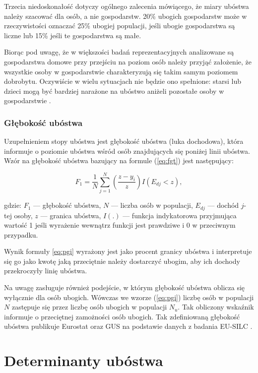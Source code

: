 Trzecia niedoskonałość dotyczy ogólnego zalecenia mówiącego, że miary ubóstwa należy szacować dla osób, a nie gospodarstw. 20\% ubogich gospodarstw może w rzeczywistości oznaczać 25\% ubogiej populacji, jeśli ubogie gospodarstwa są liczne lub 15\% jeśli te gospodarstwa są małe.

Biorąc pod uwagę, że w większości badań reprezentacyjnych analizowane są gospodarstwa domowe przy przejściu na poziom osób należy przyjąć założenie, że wszystkie osoby w gospodarstwie charakteryzują się takim samym poziomem dobrobytu. Oczywiście w wielu sytuacjach nie będzie ono spełnione: starsi lub dzieci mogą być bardziej narażone na ubóstwo aniżeli pozostałe osoby w gospodarstwie \citep{haughton2009}.

\subsubsection{Głębokość ubóstwa}

Uzupełnieniem stopy ubóstwa jest głębokość ubóstwa (luka dochodowa), która informuje o poziomie ubóstwa wśród osób znajdujących się poniżej linii ubóstwa. Wzór na głębokość ubóstwa bazujący na formule (\ref{eq:fgt}) jest następujący:

\begin{equation}
\label{eq:pgi}
F_1=\frac{1}{N}\sum\limits_{j=1}^{N}{\left(\frac{z-y_i}{z}\right)I(E_{dj}<z)},
\end{equation}

gdzie: $F_1$ --- głębokość ubóstwa, $N$ --- liczba osób w populacji, $E_{dj}$ --- dochód $j$-tej osoby, $z$ --- granica ubóstwa, $I(.)$ --- funkcja indykatorowa przyjmująca wartość 1 jeśli wyrażenie wewnątrz funkcji jest prawdziwe i 0 w przeciwnym przypadku.

Wynik formuły \ref{eq:pgi} wyrażony jest jako procent granicy ubóstwa i interpretuje się go jako kwotę jaką przeciętnie należy dostarczyć ubogim, aby ich dochody przekroczyły linię ubóstwa. 

Na uwagę zasługuje również podejście, w którym głębokość ubóstwa oblicza się wyłącznie dla osób ubogich. Wówczas we wzorze (\ref{eq:pgi}) liczbę osób w populacji $N$ zastępuje się przez liczbę osób ubogich w populacji $N_u$. Tak obliczony wskaźnik informuje o przeciętnej zamożności osób ubogich. Tak zdefiniowaną głębokość ubóstwa publikuje Eurostat oraz GUS na podstawie danych z badania EU-SILC \citep{silc2017}.

\section{Determinanty ubóstwa}\label{pr:determinanty}

